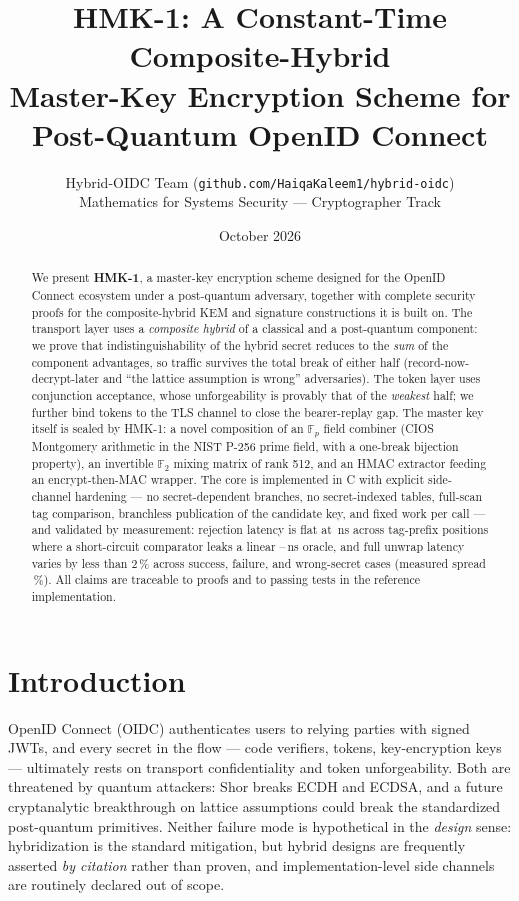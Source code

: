 \documentclass[11pt,a4paper]{article}
\title{\textbf{HMK-1: A Constant-Time Composite-Hybrid\\
Master-Key Encryption Scheme for\\
Post-Quantum OpenID Connect}}
\author{Hybrid-OIDC Team \textnormal{(\texttt{github.com/HaiqaKaleem1/hybrid-oidc})}\\
\small Mathematics for Systems Security — Cryptographer Track}
\date{October 2026}
\theoremstyle{remark}
\newcommand{\F}{\mathbb{F}}
\begin{document}
\maketitle

\begin{abstract}
We present \textbf{HMK-1}, a master-key encryption scheme designed for the
OpenID Connect ecosystem under a post-quantum adversary, together with complete
security proofs for the composite-hybrid KEM and signature constructions it is
built on. The transport layer uses a \emph{composite hybrid} of a classical and
a post-quantum component: we prove that indistinguishability of the hybrid
secret reduces to the \emph{sum} of the component advantages, so traffic
survives the total break of either half (record-now-decrypt-later and
``the lattice assumption is wrong'' adversaries). The token layer uses
conjunction acceptance, whose unforgeability is provably that of the
\emph{weakest} half; we further bind tokens to the TLS channel to close the
bearer-replay gap. The master key itself is sealed by HMK-1: a novel
composition of an $\F_p$ field combiner (CIOS Montgomery arithmetic in the
NIST P-256 prime field, with a one-break bijection property), an invertible
$\F_2$ mixing matrix of rank 512, and an HMAC extractor feeding an
encrypt-then-MAC wrapper. The core is implemented in C with explicit
side-channel hardening --- no secret-dependent branches, no secret-indexed
tables, full-scan tag comparison, branchless publication of the candidate key,
and fixed work per call --- and validated by measurement: rejection latency is
flat at \HmkCTKZero\,ns across tag-prefix positions where a short-circuit
comparator leaks a linear \HmkNaiveKZero--\HmkNaiveKThirtyOne\,ns oracle, and
full unwrap latency varies by less than 2\,\% across success, failure, and
wrong-secret cases (measured spread \HmkUnwrapSpreadPct\,\%). All claims are
traceable to proofs and to passing tests in the reference implementation.
\end{abstract}

\section{Introduction}
OpenID Connect (OIDC) authenticates users to relying parties with signed
JWTs, and every secret in the flow --- code verifiers, tokens, key-encryption
keys --- ultimately rests on transport confidentiality and token
unforgeability. Both are threatened by quantum attackers: Shor breaks ECDH
and ECDSA, and a future cryptanalytic breakthrough on lattice assumptions
could break the standardized post-quantum primitives. Neither failure mode is
hypothetical in the \emph{design} sense: hybridization is the standard
mitigation, but hybrid designs are frequently asserted \emph{by citation}
rather than proven, and implementation-level side channels are routinely
declared out of scope.
\end{document}

